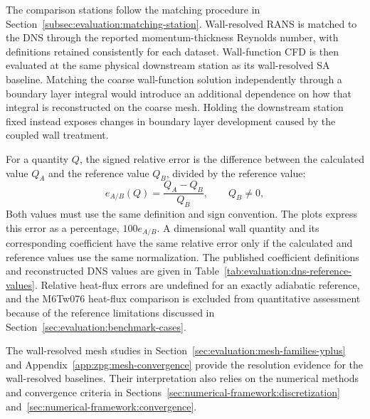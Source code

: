 The comparison stations follow the matching procedure in Section~\ref{subsec:evaluation:matching-station}. Wall-resolved RANS is matched to the DNS through the reported momentum-thickness Reynolds number, with definitions retained consistently for each dataset. Wall-function CFD is then evaluated at the same physical downstream station as its wall-resolved SA baseline. Matching the coarse wall-function solution independently through a boundary layer integral would introduce an additional dependence on how that integral is reconstructed on the coarse mesh. Holding the downstream station fixed instead exposes changes in boundary layer development caused by the coupled wall treatment.
\par\medskip

For a quantity \(Q\), the signed relative error is the difference between the calculated value \(Q_A\) and the reference value \(Q_B\), divided by the reference value:
\begin{equation}
    e_{A/B}(Q)=\frac{Q_A-Q_B}{Q_B},
    \qquad Q_B\ne0,
    \label{eq:erriso:signed-relative-error}
\end{equation}
Both values must use the same definition and sign convention. The plots express this error as a percentage, \(100e_{A/B}\). A dimensional wall quantity and its corresponding coefficient have the same relative error only if the calculated and reference values use the same normalization. The published coefficient definitions and reconstructed DNS values are given in Table~\ref{tab:evaluation:dns-reference-values}. Relative heat-flux errors are undefined for an exactly adiabatic reference, and the M6Tw076 heat-flux comparison is excluded from quantitative assessment because of the reference limitations discussed in Section~\ref{sec:evaluation:benchmark-cases}.
\par\medskip

The wall-resolved mesh studies in Section~\ref{sec:evaluation:mesh-families-yplus} and Appendix~\ref{app:zpg:mesh-convergence} provide the resolution evidence for the wall-resolved baselines. Their interpretation also relies on the numerical methods and convergence criteria in Sections~\ref{sec:numerical-framework:discretization} and~\ref{sec:numerical-framework:convergence}.
